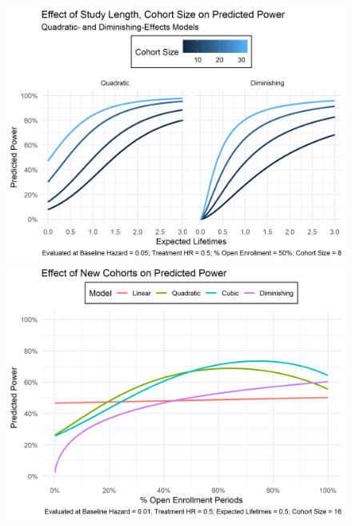 \begin{figure}
\caption[Effect of Study Length, Cohort Size on Power]{}
\label{fig:power-expected-lifetimes-cohort-size}
\includegraphics[width=\textwidth]{reports/figures/multiple-effects/power-expected-lifetimes-cohort-size.png}


\caption[Effect of New Cohorts on Power]{}
\label{fig:power-pct-open-enrollment}
\includegraphics[width=\textwidth]{reports/figures/single-effects/power-pct-open-enrollment.png}
\end{figure}
